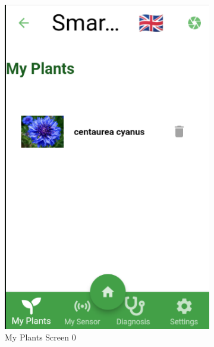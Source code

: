 \documentclass[a4paper,12pt]{report}
\begin{document}
\begin{figure}[H]	
	\begin{subfigure}{0.3\textwidth} %
		\includegraphics[width=\textwidth]{./images/my_plants/my_plants_screen2.png}
		\caption{My Plants Screen 0}
		\label{fig:my_plants}
	\end{subfigure}
	\hfill
	\begin{subfigure}{0.3\textwidth}

\end{subfigure}
\end{figure}
\end{document}
